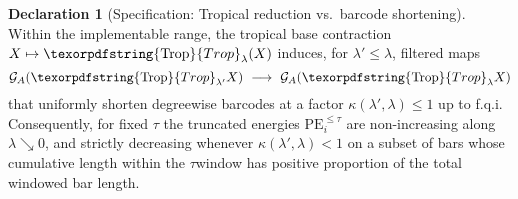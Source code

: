 \documentclass[11pt]{article}
\numberwithin{equation}{section}
\theoremstyle{plain}
\theoremstyle{definition}
\theoremstyle{remark}
\DeclareRobustCommand{\hyp}{\nobreakdash-}
\theoremstyle{plain}
\theoremstyle{definition}
\numberwithin{equation}{section}
\theoremstyle{definition}
\newtheorem{declaration}[theorem]{Declaration}
\DeclareRobustCommand{\Trop}{\texorpdfstring{\ensuremath{\operatorname{Trop}}}{Trop}}
\numberwithin{equation}{section}
\theoremstyle{plain}
\theoremstyle{definition}
\theoremstyle{remark}
\begin{document}
\begin{declaration}[Specification: Tropical reduction vs.\ barcode shortening]\label{spec:trop-short}
Within the implementable range, the tropical base contraction \(X\mapsto \Trop_\lambda(X)\) induces, for \(\lambda'\le \lambda\), filtered maps
\[
  \mathcal{G}_A(\Trop_{\lambda'}X)\ \longrightarrow\ \mathcal{G}_A(\Trop_{\lambda}X)
\]
that uniformly shorten degreewise barcodes at a factor \(\kappa(\lambda',\lambda)\le 1\) up to f.q.i.
Consequently, for fixed \(\tau\) the truncated energies \(\mathrm{PE}_i^{\le\tau}\) are non\hyp increasing along \(\lambda\searrow 0\), and strictly decreasing whenever \(\kappa(\lambda',\lambda)<1\) on a subset of bars whose cumulative length within the \(\tau\)\nobreakdash window has positive proportion of the total windowed bar length.
\end{declaration}
\end{document}

